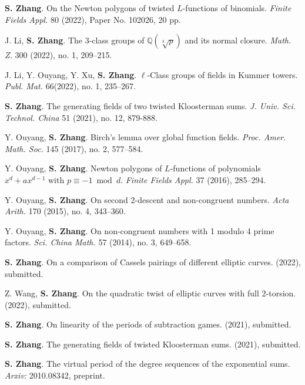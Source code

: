 \documentclass[11pt]{article}
\begin{document}
\begin{cvlist}
	\item \textbf{S. Zhang}.
	On the Newton polygons of twisted $L$-functions of binomials.
	{\em Finite Fields Appl.} 80 (2022), Paper No. 102026, 20 pp.

	\item J. Li, \textbf{S. Zhang}.
	The $3$-class groups of $\mathbb{Q}(\sqrt[3]{p})$ and its normal closure.
	{\em Math. Z.} 300 (2022), no. 1, 209--215.

	\item J. Li, Y. Ouyang, Y. Xu, \textbf{S. Zhang}.
	$\ell$-Class groups of fields in Kummer towers.
	{\em Publ. Mat.} 66(2022), no. 1, 235--267.

	\item \textbf{S. Zhang}.
	The generating fields of two twisted Kloosterman sums.
	{\em J. Univ. Sci. Technol. China} 51 (2021), no. 12, 879-888.

	\item Y. Ouyang, \textbf{S. Zhang}.
	Birch's lemma over global function fields.
	{\em Proc. Amer. Math. Soc.} 145 (2017), no. 2, 577--584.

	\item Y. Ouyang, \textbf{S. Zhang}.
	Newton polygons of $L$-functions of polynomials $x^d+ax^{d-1}$ with $p\equiv -1 \bmod d$.
	{\em Finite Fields Appl.} 37 (2016), 285--294.

	\item Y. Ouyang, \textbf{S. Zhang}.
	On second 2-descent and non-congruent numbers.
	{\em Acta Arith.} 170 (2015), no. 4, 343--360.

	\item Y. Ouyang, \textbf{S. Zhang}.
	On non-congruent numbers with 1 modulo 4 prime factors.
	{\em Sci. China Math.} 57 (2014), no. 3, 649--658.
\end{cvlist}


\begin{cvlist}
	\item \textbf{S. Zhang}.
	On a comparison of Cassels pairings of different elliptic curves.
	(2022), submitted.

	\item Z. Wang, \textbf{S. Zhang}.
	On the quadratic twist of elliptic curves with full $2$-torsion.
	(2022), submitted.

	\item \textbf{S. Zhang}.
	On linearity of the periods of subtraction games.
	(2021), submitted.

	\item \textbf{S. Zhang}.
	The generating fields of twisted Kloosterman sums.
	(2021), submitted.

	\item \textbf{S. Zhang}.
	The virtual period of the degree sequences of the exponential sums.
	{\em Arxiv:} 2010.08342, preprint.
\end{cvlist}
\end{document}
